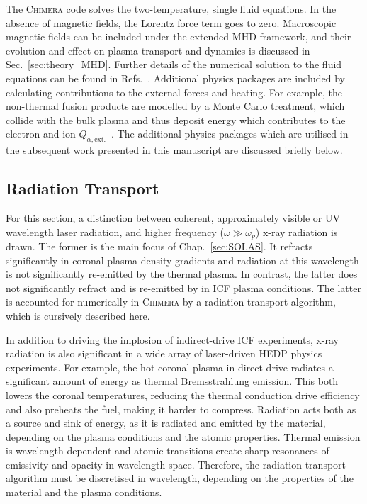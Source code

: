 The \textsc{Chimera} code solves the two-temperature, single fluid equations.
In the absence of magnetic fields, the Lorentz force term goes to zero.
Macroscopic magnetic fields can be included under the extended-\ac{MHD} framework, and their evolution and effect on plasma transport and dynamics is discussed in Sec.~\ref{sec:theory_MHD}.
Further details of the numerical solution to the fluid equations can be found in Refs.~\cite{chittenden_signatures_2016,walsh_extended_2018,crilly_simulation_2020,farrow_extended_2023,oneill_modelling_2023,chaturvedi_simulating_2024}. 
Additional physics packages are included by calculating contributions to the external forces and heating.
For example, the non-thermal fusion products are modelled by a Monte Carlo treatment, which collide with the bulk plasma and thus deposit energy which contributes to the electron and ion $Q_{\alpha,\text{ext.}}$~\cite{tong_burn_2019}.
The additional physics packages which are utilised in the subsequent work presented in this manuscript are discussed briefly below.

\subsection{Radiation Transport}%
\label{sec:theory_radtransp}

For this section, a distinction between coherent, approximately visible or \ac{UV} wavelength laser radiation, and higher frequency ($\omega \gg \omega_p$) x-ray radiation is drawn.
The former is the main focus of Chap.~\ref{sec:SOLAS}.
It refracts significantly in coronal plasma density gradients and radiation at this wavelength is not significantly re-emitted by the thermal plasma.
In contrast, the latter does not significantly refract and is re-emitted by in \ac{ICF} plasma conditions.
The latter is accounted for numerically in \textsc{Chimera} by a radiation transport algorithm, which is cursively described here.

In addition to driving the implosion of indirect-drive \ac{ICF} experiments, x-ray radiation is also significant in a wide array of laser-driven \ac{HEDP} physics experiments.
For example, the hot coronal plasma in direct-drive radiates a significant amount of energy as thermal Bremsstrahlung emission.
This both lowers the coronal temperatures, reducing the thermal conduction drive efficiency and also preheats the fuel, making it harder to compress.
Radiation acts both as a source and sink of energy, as it is radiated and emitted by the material, depending on the plasma conditions and the atomic properties.
Thermal emission is wavelength dependent and atomic transitions create sharp resonances of emissivity and opacity in wavelength space.
Therefore, the radiation-transport algorithm must be discretised in wavelength, depending on the properties of the material and the plasma conditions.

